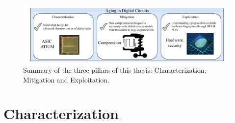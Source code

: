 \begin{figure}
    \includegraphics[width=\textwidth,trim={6mm 2mm 6mm 3mm},clip]{images/DATE.pdf}
    \caption{Summary of the three pillars of this thesis: Characterization, Mitigation and Exploitation.}
    \label{fig:PDO_Intro}
\end{figure}

\section{Characterization}

